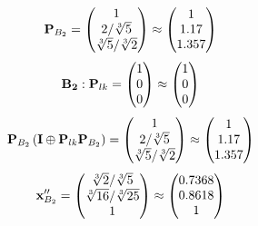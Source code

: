 \documentclass[10pt,a4paper]{article}
\begin{document}
	\[
		\bold{P}_{B_2} = 
		\begin{pmatrix}
			{1}{} \\
			{{2}} / {\sqrt[3]{5}} \\
			{\sqrt[3]{5}} / {\sqrt[3]{2}} \\
		\end{pmatrix}
		\approx
		\begin{pmatrix}
			1        \\
			1.17     \\
			1.357    \\
		\end{pmatrix}
	\]
	\[
		\bold{B_2}: \bold{P}_{lk} = 
		\begin{pmatrix}
			{1}{} \\
			{{0}}{} \\
			{{0}}{} \\
		\end{pmatrix}
		\approx
		\begin{pmatrix}
			1        \\
			0        \\
			0        \\
		\end{pmatrix}
	\]
	\[
		\bold{P}_{B_2}\left(\bold{I} \oplus \bold{P}_{lk}\bold{P}_{B_2}\right) = 
		\begin{pmatrix}
			{1}{} \\
			{{2}} / {\sqrt[3]{5}} \\
			{\sqrt[3]{5}} / {\sqrt[3]{2}} \\
		\end{pmatrix}
		\approx
		\begin{pmatrix}
			1        \\
			1.17     \\
			1.357    \\
		\end{pmatrix}
	\]
	\[
		\bold{x}''_{B_2} = 
		\begin{pmatrix}
			{\sqrt[3]{2}} / {\sqrt[3]{5}} \\
			{\sqrt[3]{16}} / {\sqrt[3]{25}} \\
			{1}{} \\
		\end{pmatrix}
		\approx
		\begin{pmatrix}
			0.7368   \\
			0.8618   \\
			1        \\
		\end{pmatrix}
	\]

\end{document}
